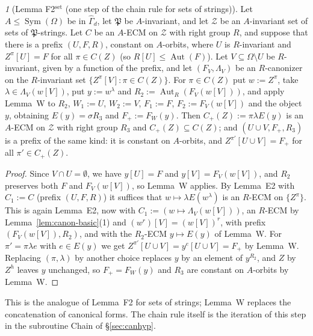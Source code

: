 \documentclass[11pt]{article}
\theoremstyle{plain}
\theoremstyle{definition}
\theoremstyle{remark}
\theoremstyle{named}
\newtheorem*{named}{}
\theoremstyle{namedrm}
\newcommand{\Sym}{\operatorname{Sym}}
\newcommand{\Aut}{\operatorname{Aut}}
\newcommand{\Gd}{\widehat{\Gamma}_d}
\newcommand{\fP}{\mathfrak{P}}
\newcommand{\cZ}{\mathcal{Z}}
\begin{document}
\begin{named}[Lemma F2$^{\text{set}}$ (one step of the chain rule for sets of strings)]
Let $A\le\Sym(\Omega)$ be in $\Gd$, let $\fP$ be $A$-invariant, and let $\cZ$ be an $A$-invariant set of sets of $\fP$-strings. Let
$C$ be an $A$-ECM on $\cZ$ with right group $R$, and suppose that there is a prefix $(U,F,R)$, constant on $A$-orbits,
where $U$ is $R$-invariant and $Z^\pi[U]=F$ for all $\pi\in C(Z)$ (so $R[U]\le\Aut(F)$). Let $V\subseteq\Omega\setminus U$ be $R$-invariant,
given by a function of the prefix, and let $(F_V,\Lambda_V)$ be an $R$-canonizer on the $R$-invariant set
$\{Z^\pi[V]:\pi\in C(Z)\}$. For $\pi\in C(Z)$ put $w:=Z^\pi$, take $\lambda\in\Lambda_V(w[V])$, put $y:=w^\lambda$ and
$R_2:=\Aut_R(F_V(w[V]))$, and apply Lemma~W to $R_2$, $W_1:=U$, $W_2:=V$, $F_1:=F$, $F_2:=F_V(w[V])$ and the
object $y$, obtaining $E(y)=\sigma R_3$ and $F_+:=F_W(y)$. Then $C_+(Z):=\pi\lambda E(y)$ is an $A$-ECM on $\cZ$ with right group
$R_3$ and $C_+(Z)\subseteq C(Z)$; and $(U\cup V,F_+,R_3)$ is a prefix of the same kind: it is constant on $A$-orbits,
and $Z^{\pi'}[U\cup V]=F_+$ for all $\pi'\in C_+(Z)$.
\end{named}
\begin{proof}
Since $V\cap U=\emptyset$, we have $y[U]=F$ and $y[V]=F_V(w[V])$, and $R_2$ preserves both $F$ and $F_V(w[V])$, so Lemma~W
applies. By Lemma~E2 with $C_1:=C$ (prefix $(U,F,R)$) it suffices that $w\mapsto\lambda E(w^\lambda)$ is an $R$-ECM on
$\{Z^\pi\}$. This is again Lemma~E2, now with $C_1:=(w\mapsto\Lambda_V(w[V]))$, an $R$-ECM by
Lemma~\ref{lem:canon-basic}(1) and $(w^r)[V]=(w[V])^r$, with prefix $(F_V(w[V]),R_2)$, and with the
$R_2$-ECM $y\mapsto E(y)$ of Lemma~W. For $\pi'=\pi\lambda e$ with $e\in E(y)$ we get $Z^{\pi'}[U\cup V]=y^e[U\cup V]=F_+$ by Lemma~W. Replacing
$(\pi,\lambda)$ by another choice replaces $y$ by an element of $y^{R_2}$, and $Z$ by $Z^h$ leaves $y$ unchanged, so
$F_+=F_W(y)$ and $R_3$ are constant on $A$-orbits by Lemma~W.
\end{proof}
This is the analogue of Lemma~F2 for sets of strings; Lemma~W replaces the concatenation of canonical
forms. The chain rule itself is the iteration of this step in the subroutine Chain of \S\ref{sec:canhyp}.
\end{document}
